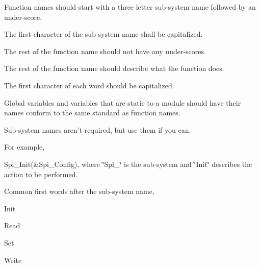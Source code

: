 \begin{DoxyItemize}
\item Function names should start with a three letter sub-\/system name followed by an under-\/score. ~\newline

\item The first character of the sub-\/system name shall be capitalized. ~\newline

\item The rest of the function name should not have any under-\/scores. ~\newline

\item The rest of the function name should describe what the function does.~\newline

\item The first character of each word should be capitalized. ~\newline

\item Global variables and variables that are static to a module should have their names conform to the same standard as function names. ~\newline

\item Sub-\/system names aren't required, but use them if you can.~\newline
~\newline

\end{DoxyItemize}

For example,
\begin{DoxyItemize}
\item Spi\+\_\+\+Init(\&\+Spi\+\_\+\+Config), where \char`\"{}\+Spi\+\_\+\char`\"{} is the sub-\/system and \char`\"{}\+Init\char`\"{} describes the action to be performed.~\newline
~\newline

\end{DoxyItemize}

Common first words after the sub-\/system name,
\begin{DoxyItemize}
\item Init
\item Read
\item Set
\item Write
\end{DoxyItemize}

